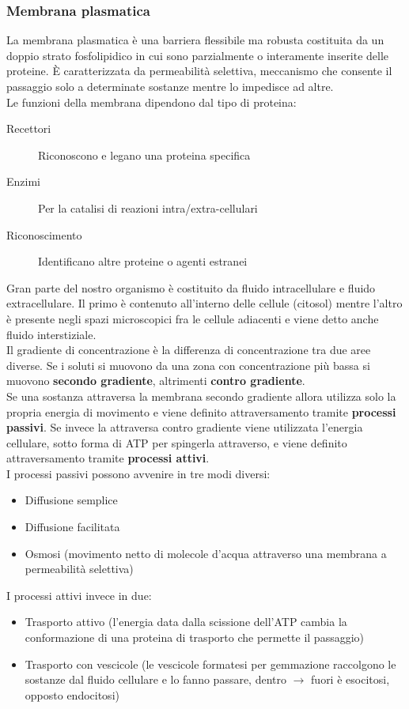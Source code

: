 \documentclass[a4paper]{article}
\begin{document}
\subsubsection{Membrana plasmatica} 
La membrana plasmatica è una barriera flessibile ma robusta costituita da un 
doppio strato fosfolipidico in cui sono parzialmente o interamente inserite 
delle proteine. È caratterizzata da permeabilità selettiva, meccanismo che 
consente il passaggio solo a determinate sostanze mentre lo impedisce ad altre.
\\ Le funzioni della membrana dipendono dal tipo di proteina:
\begin{description}
\item[Recettori] Riconoscono e legano una proteina specifica
\item[Enzimi] Per la catalisi di reazioni intra/extra-cellulari
\item[Riconoscimento] Identificano altre proteine o agenti estranei
\end{description}
Gran parte del nostro organismo è costituito da fluido intracellulare e 
fluido extracellulare. Il primo è contenuto all’interno delle cellule (citosol)
mentre l'altro è presente negli spazi microscopici fra le cellule adiacenti e 
viene detto anche fluido interstiziale. \\
Il gradiente di concentrazione è la differenza di concentrazione tra due aree 
diverse. Se i soluti si muovono da una zona con concentrazione più bassa si 
muovono \textbf{secondo gradiente}, altrimenti \textbf{contro gradiente}.
\\ Se una sostanza attraversa la membrana secondo gradiente allora utilizza
solo la propria energia di movimento e viene definito attraversamento tramite
\textbf{processi passivi}. Se invece la attraversa contro gradiente viene
utilizzata l'energia cellulare, sotto forma di ATP per spingerla attraverso,
e viene definito attraversamento tramite \textbf{processi attivi}. \\
I processi passivi possono avvenire in tre modi diversi:
\begin{itemize}
    \item Diffusione semplice
    \item Diffusione facilitata
    \item Osmosi (movimento netto di molecole d’acqua attraverso una membrana 
    a permeabilità selettiva)
\end{itemize}
I processi attivi invece in due:
\begin{itemize}
    \item Trasporto attivo (l'energia data dalla scissione dell'ATP cambia la
    conformazione di una proteina di trasporto che permette il passaggio)
    \item Trasporto con vescicole (le vescicole formatesi per gemmazione
    raccolgono le sostanze dal fluido cellulare e lo fanno passare, dentro
    $\to$ fuori è esocitosi, opposto endocitosi)
\end{itemize}
\end{document}
